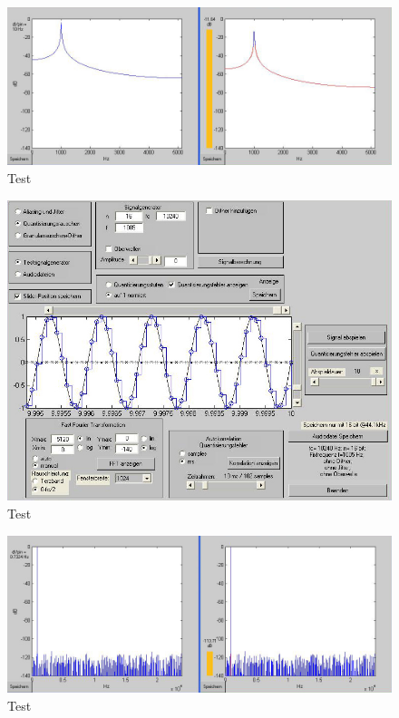 \begin{figure}[h!]
\centering
\includegraphics[width=\columnwidth]{figures/Aufg1/2_2_fenster_schlecht.JPG} 
\caption{Test}
\end{figure}

\begin{figure}[h!]
\centering
\includegraphics[width=\columnwidth]{figures/Aufg1/2_2_fenster_schlecht_einstell.JPG} 
\caption{Test}
\end{figure}

\begin{figure}[h!]
\centering
\includegraphics[width=\columnwidth]{figures/Aufg1/2_3_890hz.JPG} 
\caption{Test}
\end{figure}

